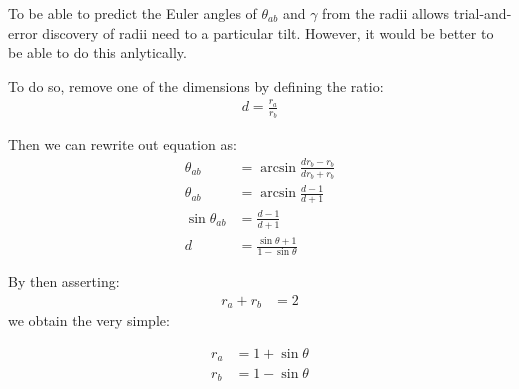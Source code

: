 \documentclass{article}
\begin{document}
To be able to predict the Euler angles of $\theta_{ab}$ and $\gamma$ from the radii allows trial-and-error
discovery of radii need to a particular tilt.  However, it would be better to be able to do this
anlytically.

To do so, remove one of the dimensions by defining the ratio:
\begin{align}
d = \frac{r_a}{r_b}
\end{align}

Then we can rewrite out equation as:
\begin{align}
  \theta_{ab} &= \arcsin{\frac{d r_b - r_b}{d r_b + r_b}} \\
  \theta_{ab} &= \arcsin{\frac{d - 1}{d + 1}} \\
  \sin{\theta_{ab}} &= \frac{d - 1}{d + 1} \\
  d &= \frac{\sin{\theta} + 1}{1 - \sin{\theta}}
\end{align}

By then asserting:
\begin{align}
r_a + r_b &= 2
\end{align}
we obtain the very simple:

\begin{align}
  r_a &= 1 + \sin{\theta}  \\
  r_b &= 1 - \sin{\theta}
\end{align}

















\end{document}
